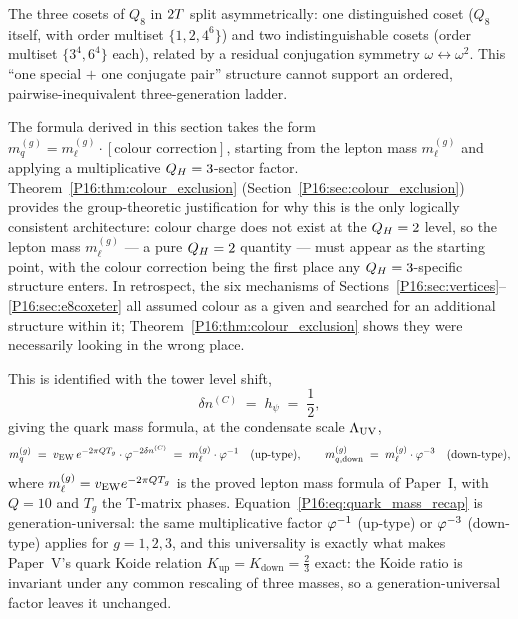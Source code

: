 \begin{proposition}
\label{P16:prop:q8_fail}
The three cosets of $Q_8$ in $2T$ split asymmetrically: one
distinguished coset ($Q_8$ itself, with order multiset $\{1,2,4^6\}$)
and two indistinguishable cosets (order multiset $\{3^4,6^4\}$ each),
related by a residual conjugation symmetry $\omega\leftrightarrow\omega^2$.
This ``one special $+$ one conjugate pair'' structure cannot support an
ordered, pairwise-inequivalent three-generation ladder.
\end{proposition}

\begin{remark}
\label{P16:rem:architecture_justified}
The formula derived in this section takes the form
$m_q^{(g)} = m_\ell^{(g)} \cdot [\text{colour correction}]$, starting
from the lepton mass $m_\ell^{(g)}$ and applying a multiplicative
$Q_H=3$-sector factor.  Theorem~\ref{P16:thm:colour_exclusion}
(Section~\ref{P16:sec:colour_exclusion}) provides the group-theoretic
justification for why this is the only logically consistent
architecture: colour charge does not exist at the $Q_H=2$ level, so
the lepton mass $m_\ell^{(g)}$ --- a pure $Q_H=2$ quantity --- must
appear as the starting point, with the colour correction being the
first place any $Q_H=3$-specific structure enters.  In retrospect,
the six mechanisms of Sections~\ref{P16:sec:vertices}--\ref{P16:sec:e8coxeter}
all assumed colour as a given and searched for an additional structure
within it; Theorem~\ref{P16:thm:colour_exclusion} shows they were
necessarily looking in the wrong place.
\end{remark}

This is identified with the tower level shift,
\begin{equation}
  \delta n^{(C)} \;=\; h_\psi \;=\; \frac12,
  \label{P16:eq:dn_shift}
\end{equation}
giving the quark mass formula, at the condensate scale $\Lambda_{\mathrm{UV}}$,
\begin{equation}
  m_q^{(g)} \;=\; v_{\mathrm{EW}}\,e^{-2\pi QT_g}\cdot\varphi^{-2\delta n^{(C)}}
  \;=\; m_\ell^{(g)}\cdot\varphi^{-1}
  \quad(\text{up-type}),
  \qquad
  m_{q,\mathrm{down}}^{(g)}
  \;=\; m_\ell^{(g)}\cdot\varphi^{-3}
  \quad(\text{down-type}),
  \label{P16:eq:quark_mass_recap}
\end{equation}
where $m_\ell^{(g)}=v_{\mathrm{EW}} e^{-2\pi QT_g}$ is the proved lepton mass
formula of Paper~I, with $Q=10$ and $T_g$ the T-matrix phases.
Equation~\eqref{P16:eq:quark_mass_recap} is generation-universal: the
same multiplicative factor $\varphi^{-1}$ (up-type) or $\varphi^{-3}$
(down-type) applies for $g=1,2,3$, and this universality is exactly
what makes Paper~V's quark Koide relation $K_{\mathrm{up}}=K_{\mathrm{down}}=\tfrac23$
exact: the Koide ratio is invariant under any common rescaling of
three masses, so a generation-universal factor leaves it unchanged.

